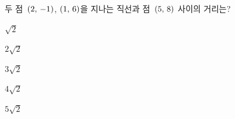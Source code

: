 두 점~$(2,\mkern3mu -1)$, $(1,\mkern3mu 6)$을 지나는 직선과 점~$(5,\mkern3mu 8)$ 사이의 거리는?
\begin{choices32}{\rule[-3ex]{0pt}{8ex}$\sqrt{2}$}{\rule[-3ex]{0pt}{8ex}$2\sqrt{2}$}{\rule[-3ex]{0pt}{8ex}$3\sqrt{2}$}{\rule[-3ex]{0pt}{8ex}$4\sqrt{2}$}{\rule[-3ex]{0pt}{8ex}$5\sqrt{2}$}\end{choices32}
